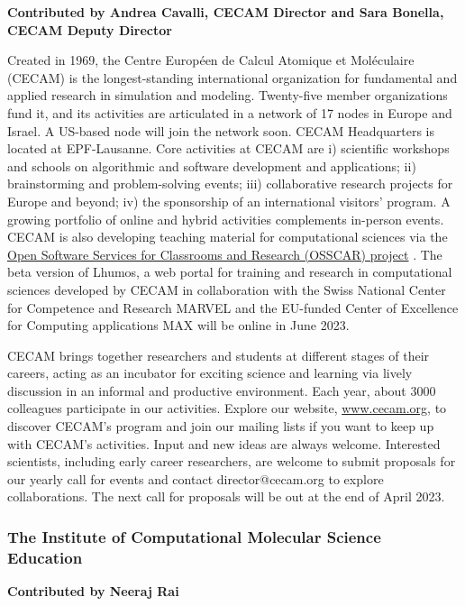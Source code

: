 \documentclass[9pt,review]{livecoms}
\begin{document}
\textbf{Contributed by Andrea Cavalli, CECAM Director and Sara Bonella, CECAM Deputy Director}

Created in 1969, the Centre Européen de Calcul Atomique et Moléculaire (CECAM) is the longest-standing international organization for fundamental and applied research in simulation and modeling. 
Twenty-five member organizations fund it, and its activities are articulated in a network of 17 nodes in Europe and Israel. 
A US-based node will join the network soon. 
CECAM Headquarters is located at EPF-Lausanne. 
Core activities at CECAM are i) scientific workshops and schools on algorithmic and software development and applications; ii) brainstorming and problem-solving events; iii) collaborative research projects for Europe and beyond; iv) the sponsorship of an international visitors’ program. 
A growing portfolio of online and hybrid activities complements in-person events. 
CECAM is also developing teaching material for computational sciences via the \href{https://www.osscar.org/}{Open Software Services for Classrooms and Research (OSSCAR) project} \cite{DU2023}. 
The beta version of Lhumos, a web portal for training and research in computational sciences developed by CECAM in collaboration with the Swiss National Center for Competence and Research MARVEL and the EU-funded Center of Excellence for Computing applications MAX will be online in June 2023.
 
CECAM brings together researchers and students at different stages of their careers, acting as an incubator for exciting science and learning via lively discussion in an informal and productive environment. 
Each year, about 3000 colleagues participate in our activities. 
Explore our website, \href{https://www.cecam.org/}{www.cecam.org}, to discover CECAM’s program and join our mailing lists if you want to keep up with CECAM’s activities. 
Input and new ideas are always welcome. 
Interested scientists, including early career researchers, are welcome to submit proposals for our yearly call for events and contact director@cecam.org to explore collaborations. 
The next call for proposals will be out at the end of April 2023.


\subsubsection{The Institute of Computational Molecular Science Education}

\textbf{Contributed by Neeraj Rai}
\end{document}
